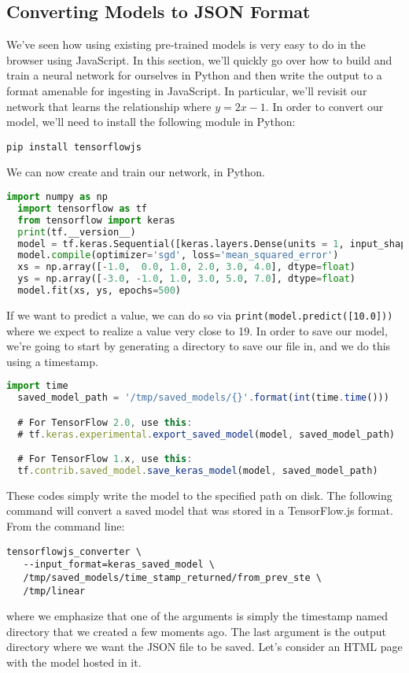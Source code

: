 \documentclass[12pt]{article}
\begin{document}
\subsection{Converting Models to JSON Format}
We've seen how using existing pre-trained models is very easy to do in the browser using JavaScript. In this section, we'll quickly go over how to build and train a neural network for ourselves in Python and then write the output to a format amenable for ingesting in JavaScript. In particular, we'll revisit our network that learns the relationship where $y = 2x - 1$. In order to convert our model, we'll need to install the following module in Python:
\begin{verbatim}
pip install tensorflowjs
\end{verbatim}
We can now create and train our network, in Python.
\begin{lstlisting}[language=Python]
  import numpy as np
  import tensorflow as tf
  from tensorflow import keras
  print(tf.__version__)
  model = tf.keras.Sequential([keras.layers.Dense(units = 1, input_shape=[1])])
  model.compile(optimizer='sgd', loss='mean_squared_error')
  xs = np.array([-1.0,  0.0, 1.0, 2.0, 3.0, 4.0], dtype=float)
  ys = np.array([-3.0, -1.0, 1.0, 3.0, 5.0, 7.0], dtype=float)
  model.fit(xs, ys, epochs=500)
\end{lstlisting}
If we want to predict a value, we can do so via \texttt{print(model.predict([10.0]))} where we expect to realize a value very close to 19. In order to save our model, we're going to start by generating a directory to save our file in, and we do this using a timestamp.
\begin{lstlisting}[language=JavaScript]
  import time
  saved_model_path = '/tmp/saved_models/{}'.format(int(time.time()))

  # For TensorFlow 2.0, use this:
  # tf.keras.experimental.export_saved_model(model, saved_model_path)

  # For TensorFlow 1.x, use this:
  tf.contrib.saved_model.save_keras_model(model, saved_model_path)
\end{lstlisting}
These codes simply write the model to the specified path on disk.
The following command will convert a saved model that was stored in a TensorFlow.js format. From the command line:
\begin{verbatim}
tensorflowjs_converter \
   --input_format=keras_saved_model \
   /tmp/saved_models/time_stamp_returned/from_prev_ste \
   /tmp/linear
\end{verbatim}
where we emphasize that one of the arguments is simply the timestamp named directory that we created a few moments ago. The last argument is the output directory where we want the JSON file to be saved. Let's consider an HTML page with the model hosted in it.
\end{document}

